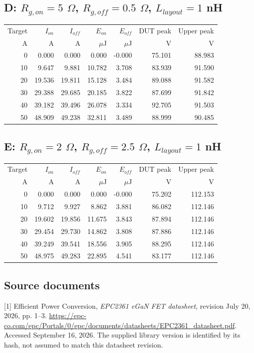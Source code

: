 \documentclass[10pt,a4paper]{article}
\begin{document}
\subsection*{D: $R_{g,on}=5$ $\Omega$, $R_{g,off}=0.5$ $\Omega$, $L_{layout}=1$ nH}
\begin{center}\small\begin{tabular}{rrrrrrr}\toprule Target & $I_{on}$ & $I_{off}$ & $E_{on}$ & $E_{off}$ & DUT peak & Upper peak\\ A & A & A & $\mu$J & $\mu$J & V & V\\\midrule
0 & 0.000 & 0.000 & 0.000 & -0.000 & 75.101 & 88.983\\
10 & 9.647 & 9.881 & 10.782 & 3.708 & 83.939 & 91.590\\
20 & 19.536 & 19.811 & 15.128 & 3.484 & 89.088 & 91.582\\
30 & 29.388 & 29.685 & 20.185 & 3.822 & 87.699 & 91.842\\
40 & 39.182 & 39.496 & 26.078 & 3.334 & 92.705 & 91.503\\
50 & 48.909 & 49.238 & 32.811 & 3.489 & 88.999 & 90.485\\
\bottomrule\end{tabular}\end{center}
\subsection*{E: $R_{g,on}=2$ $\Omega$, $R_{g,off}=2.5$ $\Omega$, $L_{layout}=1$ nH}
\begin{center}\small\begin{tabular}{rrrrrrr}\toprule Target & $I_{on}$ & $I_{off}$ & $E_{on}$ & $E_{off}$ & DUT peak & Upper peak\\ A & A & A & $\mu$J & $\mu$J & V & V\\\midrule
0 & 0.000 & 0.000 & 0.000 & -0.000 & 75.202 & 112.153\\
10 & 9.712 & 9.927 & 8.862 & 3.881 & 86.082 & 112.146\\
20 & 19.602 & 19.856 & 11.675 & 3.843 & 87.894 & 112.146\\
30 & 29.454 & 29.730 & 14.862 & 3.808 & 87.886 & 112.146\\
40 & 39.249 & 39.541 & 18.556 & 3.905 & 88.295 & 112.146\\
50 & 48.975 & 49.283 & 22.895 & 4.541 & 83.177 & 112.146\\
\bottomrule\end{tabular}\end{center}
\subsection*{Source documents}
[1] Efficient Power Conversion, \emph{EPC2361 eGaN FET datasheet}, revision July 20, 2026, pp. 1--3. \url{https://epc-co.com/epc/Portals/0/epc/documents/datasheets/EPC2361_datasheet.pdf}. Accessed September 16, 2026. The supplied library version is identified by its hash, not assumed to match this datasheet revision.
\end{document}
